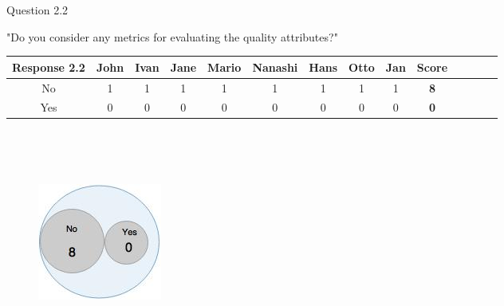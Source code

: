 \begin{shaded} Question 2.2 \end{shaded} \label{question:hybris_architecture/interview/question_2.2}
"Do you consider any metrics for evaluating the quality attributes?"\\
\begin{table}[H]
\centering
\begin{adjustbox}{max width=\textwidth}
\begin{tabular}{*{14}{|c}|}%
\hline
\textbf{Response 2.2}   & John & Ivan & Jane & Mario & Nanashi & Hans & Otto & Jan & \textbf{Score}\\
 \hline
No          & 1 & 1 & 1 & 1 & 1 & 1 & 1 & 1 & \textbf{8}    \\ 
 \hline
Yes                & 0 & 0 & 0 & 0 & 0 & 0 & 0 & 0 & \textbf{0}    \\ 
 \hline
\end{tabular}
\end{adjustbox}
\label{tab:hybris_architecture/interview/question_2.2}
\end{table}
\\

\\
\begin{figure}[H]
\begin{center}
\includegraphics[scale=0.5]{figures/question2_2}
\label{fig:hybris_architecture/interview/question2-2}
\end{center}
\end{figure}

